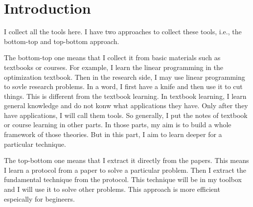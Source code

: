 \documentclass[../../note.tex]{subfiles}
\begin{document}
\chapter{Introduction}
I collect all the tools here. I have two approaches to collect these tools, i.e., the bottom-top and top-bottom approach. 

The bottom-top one means that I collect it from basic materials such as textbooks or courses. For example, I learn the linear programming in the optimization textbook. Then in the research side, I may use linear programming to sovle research problems. In a word, I first have a knife and then use it to cut things. This is different from the textbook learning. In textbook learning, I learn general knowledge and do not konw what applications they have. Only after they have applications, I will call them tools. So generally, I put the notes of textbook or course learning in other parts. In those parts, my aim is to build a whole framework of those theories. But in this part, I aim to learn deeper for a particular technique.

The top-bottom one means that I extract it directly from the papers. This means I learn a protocol from a paper to solve a particular problem. Then I extract the fundamental technique from the protocol. This technique will be in my toolbox and I will use it to solve other problems. This approach is more efficient espeically for begineers.
\end{document}
